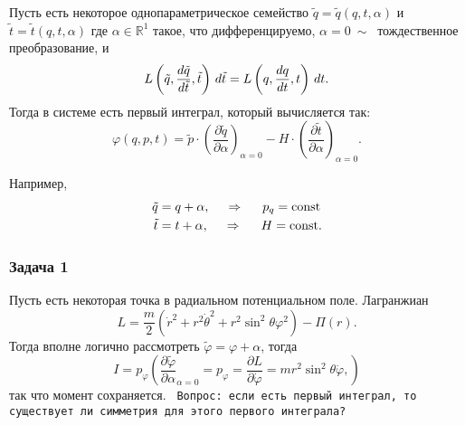 \begin{to_thr}
    Пусть есть некоторое однопараметрическое семейство $\tilde{q} = \tilde{q}(q, t, \alpha)$ и $\tilde{t} = \tilde{t} (q, t, \alpha)$ где $\alpha \in \mathbb{R}^1$ такое, что дифференцируемо, $\alpha =0 \ \sim \ $ тождественное преобразование, и
    \begin{equation*}
        L \left(\tilde{q}, \frac{d \tilde{q}}{d \tilde{t}}, \tilde{t}\right) \, d \tilde{t} = L\left(q, \frac{d q}{d t}, t\right) \, d t.
    \end{equation*}
    Тогда в системе есть первый интеграл, который вычисляется так:
    \begin{equation*}
        \varphi(q, p, t) = \tilde{p} \cdot \left(
            \frac{\partial \tilde{q}}{\partial \alpha} 
        \right)_{\alpha=0} - H \cdot \left(
            \frac{\partial \tilde{t}}{\partial \alpha} 
        \right)_{\alpha=0}.
    \end{equation*}
\end{to_thr}

Например, 
\begin{align*}
    \tilde{q} &= q + \alpha, \hspace{0.5cm} \Rightarrow \hspace{0.5cm} p_q = \text{const} \\
    \tilde{t} &= t + \alpha, \hspace{0.5cm} \Rightarrow \hspace{0.5cm} H = \text{const}.
\end{align*}


\subsubsection*{Задача 1}
Пусть есть некоторая точка в радиальном потенциальном поле. Лагранжиан
\begin{equation*}
    L = \frac{m}{2} (
        \dot{r}^2 + r^2 \dot{\theta}^2 + r^2 \sin^2 \theta \varphi^2
    ) - \Pi(r).
\end{equation*}
Тогда вполне логично рассмотреть $\tilde{\varphi} = \varphi + \alpha$, тогда
\begin{equation*}
    I = p_\varphi \left(
        \frac{\partial \tilde{\varphi}}{\partial \alpha}_{\alpha=0} = p_\varphi = \frac{\partial L}{\partial \dot{\varphi}} = m r^2 \sin^2 \theta \dot{\varphi},
    \right)
\end{equation*}
так что момент сохраняется. 
\texttt{ Вопрос: если есть первый интеграл, то существует ли симметрия для этого первого интеграла?}

